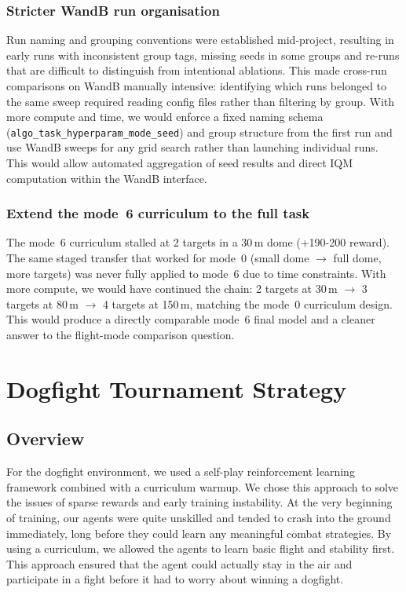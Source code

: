 \documentclass[11pt,a4paper]{article}
\begin{document}
\subsubsection{Stricter WandB run organisation}

Run naming and grouping conventions were established mid-project, resulting in early runs with inconsistent group tags, missing seeds in some groups and re-runs that are difficult to distinguish from intentional ablations. This made cross-run comparisons on WandB manually intensive: identifying which runs belonged to the same sweep required reading config files rather than filtering by group. With more compute and time, we would enforce a fixed naming schema (\texttt{algo\_task\_hyperparam\_mode\_seed}) and group structure from the first run and use WandB sweeps for any grid search rather than launching individual runs. This would allow automated aggregation of seed results and direct IQM computation within the WandB interface.

\subsubsection{Extend the mode~6 curriculum to the full task}

The mode~6 curriculum stalled at 2 targets in a 30\,m dome (+190-200 reward). The same staged transfer that worked for mode~0 (small dome $\to$ full dome, more targets) was never fully applied to mode~6 due to time constraints. With more compute, we would have continued the chain: 2 targets at 30\,m $\to$ 3 targets at 80\,m $\to$ 4 targets at 150\,m, matching the mode~0 curriculum design. This would produce a directly comparable mode~6 final model and a cleaner answer to the flight-mode comparison question.

\section{Dogfight Tournament Strategy}
\label{sec:dogfight}

\subsection{Overview}

For the dogfight environment, we used a self-play reinforcement learning framework combined with a curriculum warmup. We chose this approach to solve the issues of sparse rewards and early training instability. At the very beginning of training, our agents were quite unskilled and tended to crash into the ground immediately, long before they could learn any meaningful combat strategies. By using a curriculum, we allowed the agents to learn basic flight and stability first. This approach ensured that the agent could actually stay in the air and participate in a fight before it had to worry about winning a dogfight.
\end{document}
